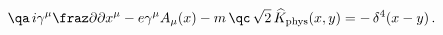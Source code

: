 \begin{equation}
\qa\, i\gamma^\mu\fraz \partial{\partial x^\mu} - e\gamma^\mu
A_\mu(x)-m \,\qc\, \sqrt{2}\,{\widehat K}_{\rm
phys}(x,y)=-\,\delta^4(x-y)\,.
\end{equation}

